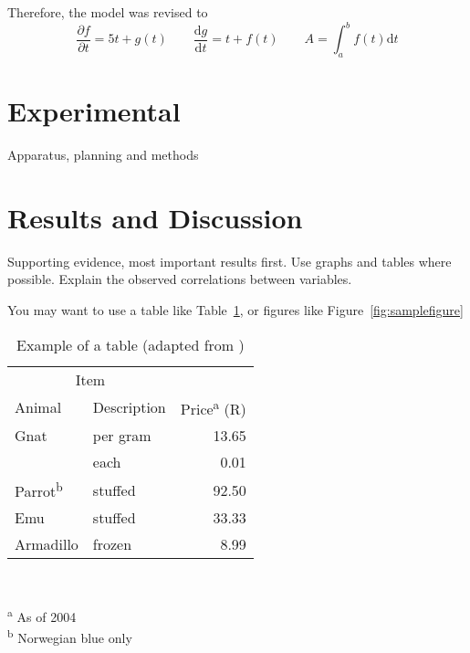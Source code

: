 \documentclass[a4paper,12pt]{article}
\begin{document}
Therefore, the model was revised to
\begin{equation}
  \frac{\partial f}{\partial t} = 5t + g(t) \qquad \frac{\mathrm{d} g}{\mathrm{d} t} = t + f(t) \qquad A = \int_a^b f(t) \mathrm{d} t
\end{equation}


\section{Experimental}
Apparatus, planning and methods


\section{Results and Discussion}
Supporting evidence, most important results first. Use graphs and tables where possible. Explain the observed correlations between variables.

You may want to use a table like Table~\ref{tab:tabexample}, or figures like Figure~\ref{fig:samplefigure}

\begin{table}[htbp]
  \centering
  \caption[Short caption for table of tables]{Example of a table (adapted from \citet{fear})}
  \label{tab:tabexample}
  \begin{minipage}{0.5\textwidth}
    \begin{centering}
      \begin{tabular}{@{}llr@{}} \toprule 
        \multicolumn{2}{c}{Item}                                               \\ 
        \cmidrule(r){1-2} 
        Animal                    & Description & Price\textsuperscript{a} (R) \\ 
        \midrule 
        Gnat                      & per gram    & \num{13.65}                  \\ 
                                  & each        & \num{0.01}                   \\ 
        Parrot\textsuperscript{b} & stuffed     & \num{92.50}                  \\ 
        Emu                       & stuffed     & \num{33.33}                  \\ 
        Armadillo                 & frozen      & \num{8.99}                   \\ 
        \bottomrule 
      \end{tabular}                                                            \\
    \end{centering} 
    \vspace{1em}
    \textsuperscript{a} As of 2004                                             \\
    \textsuperscript{b} Norwegian blue only
  \end{minipage}
\end{table}
\end{document}
